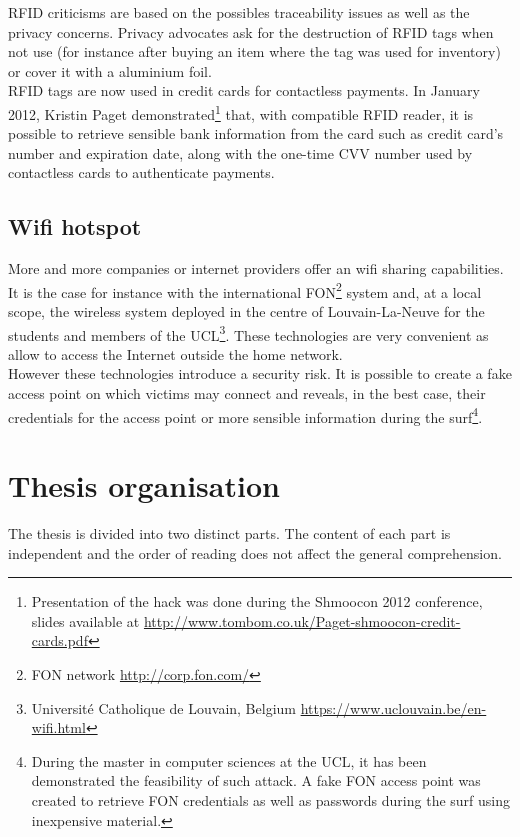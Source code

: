 RFID criticisms are based on the possibles traceability issues as well as the privacy concerns.
Privacy advocates ask for the destruction of RFID tags when not use (for instance after buying an item where the tag was used for inventory) or cover it with a aluminium foil.\\

RFID tags are now used in credit cards for contactless payments.
In January 2012, Kristin Paget demonstrated\footnote{Presentation of the hack was done during the Shmoocon 2012 conference, slides available at \url{http://www.tombom.co.uk/Paget-shmoocon-credit-cards.pdf}} that, with compatible RFID reader, it is possible to retrieve sensible bank information from the card such as credit card's number and expiration date, along with the one-time CVV number used by contactless cards to authenticate payments.

\subsection{Wifi hotspot}

More and more companies or internet providers offer an wifi sharing capabilities.
It is the case for instance with the international FON\footnote{FON network \url{http://corp.fon.com/}} system and, at a local scope, the wireless system deployed in the centre of Louvain-La-Neuve for the students and members of the UCL\footnote{Université Catholique de Louvain, Belgium \url{https://www.uclouvain.be/en-wifi.html}}.
These technologies are very convenient as allow to access the Internet outside the home network.\\

However these technologies introduce a security risk.
It is possible to create a fake access point on which victims may connect and reveals, in the best case, their credentials for the access point or more sensible information during the surf\footnote{During the master in computer sciences at the UCL, it has been demonstrated the feasibility of such attack. A fake FON access point was created to retrieve FON credentials as well as passwords during the surf using inexpensive material.}.

\section{Thesis organisation}

The thesis is divided into two distinct parts.
The content of each part is independent and the order of reading does not affect the general comprehension.\\

